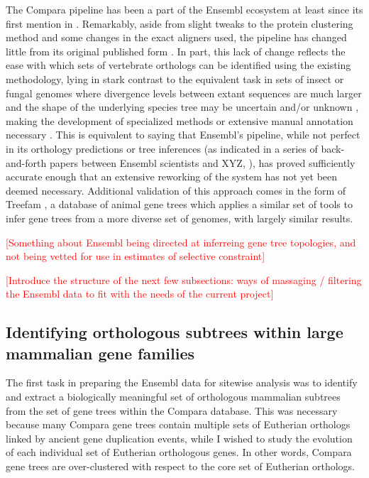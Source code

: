 The Compara pipeline has been a part of the Ensembl ecosystem at least
since its first mention in \citep{TODO}. Remarkably, aside from slight
tweaks to the protein clustering method and some changes in the exact
aligners used, the pipeline has changed little from its original
published form \citep{TODO}. In part, this lack of change reflects the
ease with which sets of vertebrate orthologs can be identified using
the existing methodology, lying in stark contrast to the equivalent
task in sets of insect or fungal genomes where divergence levels
between extant sequences are much larger \citep{TODO} and the shape of
the underlying species tree may be uncertain and/or unknown
\citep{TODO}, making the development of specialized methods or
extensive manual annotation necessary \citep{TODO}. This is equivalent
to saying that Ensembl's pipeline, while not perfect in its orthology
predictions or tree inferences (as indicated in a series of
back-and-forth papers between Ensembl scientists and XYZ,
\citep{TODO}), has proved sufficiently accurate enough that an
extensive reworking of the system has not yet been deemed
necessary. Additional validation of this approach comes in the form of
Treefam \citep{TODO}, a database of animal gene trees which applies a
similar set of tools to infer gene trees from a more diverse set of
genomes, with largely similar results.

\textcolor{red}{[Something about Ensembl being directed at inferreing gene tree topologies, and not being vetted for use in estimates of selective constraint]}

\textcolor{red}{[Introduce the structure of the next few subsections: ways of massaging / filtering the Ensembl data to fit with the needs of the current project]}

\subsection{Identifying orthologous subtrees within large mammalian gene families}

The first task in preparing the Ensembl data for sitewise analysis was
to identify and extract a biologically meaningful set of orthologous
mammalian subtrees from the set of gene trees within the Compara
database. This was necessary because many Compara gene trees contain
multiple sets of Eutherian orthologs linked by ancient gene
duplication events, while I wished to study the evolution of each
individual set of Eutherian orthologous genes. In other words, Compara
gene trees are over-clustered with respect to the core set of
Eutherian orthologs.

